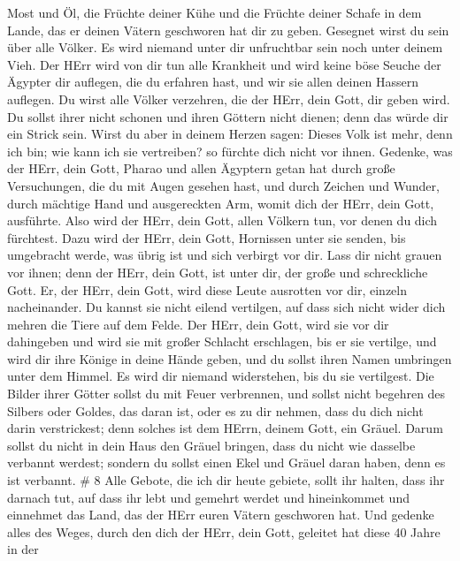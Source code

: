 Most und Öl, die Früchte deiner Kühe und die Früchte deiner Schafe in
dem Lande, das er deinen Vätern geschworen hat dir zu geben.
 Gesegnet wirst du sein über alle Völker. Es wird niemand
unter dir unfruchtbar sein noch unter deinem Vieh.  Der
HErr wird von dir tun alle Krankheit und wird keine böse Seuche der
Ägypter dir auflegen, die du erfahren hast, und wir sie allen deinen
Hassern auflegen.  Du wirst alle Völker verzehren, die der
HErr, dein Gott, dir geben wird. Du sollst ihrer nicht schonen und ihren
Göttern nicht dienen; denn das würde dir ein Strick sein. 
Wirst du aber in deinem Herzen sagen: Dieses Volk ist mehr, denn ich
bin; wie kann ich sie vertreiben?  so fürchte dich nicht
vor ihnen. Gedenke, was der HErr, dein Gott, Pharao und allen Ägyptern
getan hat  durch große Versuchungen, die du mit Augen
gesehen hast, und durch Zeichen und Wunder, durch mächtige Hand und
ausgereckten Arm, womit dich der HErr, dein Gott, ausführte. Also wird
der HErr, dein Gott, allen Völkern tun, vor denen du dich fürchtest.
 Dazu wird der HErr, dein Gott, Hornissen unter sie senden,
bis umgebracht werde, was übrig ist und sich verbirgt vor dir.
 Lass dir nicht grauen vor ihnen; denn der HErr, dein Gott,
ist unter dir, der große und schreckliche Gott.  Er, der
HErr, dein Gott, wird diese Leute ausrotten vor dir, einzeln
nacheinander. Du kannst sie nicht eilend vertilgen, auf dass sich nicht
wider dich mehren die Tiere auf dem Felde.  Der HErr, dein
Gott, wird sie vor dir dahingeben und wird sie mit großer Schlacht
erschlagen, bis er sie vertilge,  und wird dir ihre Könige
in deine Hände geben, und du sollst ihren Namen umbringen unter dem
Himmel. Es wird dir niemand widerstehen, bis du sie vertilgest.
 Die Bilder ihrer Götter sollst du mit Feuer verbrennen,
und sollst nicht begehren des Silbers oder Goldes, das daran ist, oder
es zu dir nehmen, dass du dich nicht darin verstrickest; denn solches
ist dem HErrn, deinem Gott, ein Gräuel.  Darum sollst du
nicht in dein Haus den Gräuel bringen, dass du nicht wie dasselbe
verbannt werdest; sondern du sollst einen Ekel und Gräuel daran haben,
denn es ist verbannt. \# 8  Alle Gebote, die ich dir heute
gebiete, sollt ihr halten, dass ihr darnach tut, auf dass ihr lebt und
gemehrt werdet und hineinkommet und einnehmet das Land, das der HErr
euren Vätern geschworen hat.  Und gedenke alles des Weges,
durch den dich der HErr, dein Gott, geleitet hat diese 40 Jahre in der

